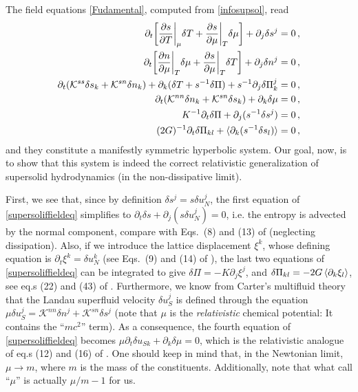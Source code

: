 \documentclass[a4paper, amsfonts, amssymb, amsmath, reprint, showkeys, nofootinbib, twoside, onecolumn,notitlepage]{revtex4-1}
\begin{document}
The field equations \eqref{Fudamental}, computed from \eqref{infosupsol}, read 
\begin{equation}\label{supersoliffieldeq}
\begin{split}
\partial_t \bigg[\dfrac{\partial s}{\partial T}\bigg|_{\mu}   \delta T + \dfrac{\partial s}{\partial \mu}\bigg|_{T}   \delta \mu  \bigg] +\partial_j \delta s^j ={}& 0 \, , \\
\partial_t \bigg[\dfrac{\partial n}{\partial \mu}\bigg|_{T}  \delta \mu + \dfrac{\partial s}{\partial \mu}\bigg|_{T}   \delta T  \bigg] +\partial_j \delta n^j={}& 0 \, , \\
\partial_t (\mathcal{K}^{ss} \delta s_k + \mathcal{K}^{sn}\delta n_k) +\partial_k (\delta T+s^{-1} \delta \Pi) + s^{-1} \partial_j \delta \Pi^j_k={}& 0 \, , \\
\partial_t (\mathcal{K}^{nn} \delta n_k + \mathcal{K}^{sn}\delta s_k) +\partial_k \delta \mu={}& 0 \, , \\
K^{-1} \partial_t \delta \Pi +\partial_j (s^{-1} \delta s^j)={}& 0 \, , \\
(2G)^{-1} \partial_t \delta \Pi_{kl} + \braket{\partial_k (s^{-1}\delta s_l)}={}& 0 \, , \\
\end{split}
\end{equation}
and they constitute a manifestly symmetric hyperbolic system. Our goal, now, is to show that this system is indeed the correct relativistic generalization of supersolid hydrodynamics \cite{Sears2010} (in the non-dissipative limit). 

First, we see that, since by definition $\delta s^j=s\delta u_N^j$, the first equation of \eqref{supersoliffieldeq} simplifies to $\partial_t \delta s+\partial_j (s\delta u_N^j)=0$, i.e. the entropy is advected by the normal component, compare with Eqs.\ (8) and (13) of \cite{Sears2010} (neglecting dissipation). Also, if we introduce the lattice displacement $\xi^k$, whose defining equation is $\partial_t \xi^k = \delta u_N^k$ (see Eqs.\ (9) and (14) of \cite{Sears2010}), the last two equations of \eqref{supersoliffieldeq} can be integrated to give $\delta \Pi=-K\partial_j \xi^j$, and $\delta \Pi_{kl}=-2G\braket{\partial_k \xi_l}$, see eq.s (22) and (43) of \cite{Sears2010}. Furthermore, we know from Carter's multifluid theory \cite{cool1995} that the Landau superfluid velocity $\delta u_S^j$ is defined through the equation $\mu  \delta u_S^j = \mathcal{K}^{nn}\delta n^j+\mathcal{K}^{sn}\delta s^j$ (note that $\mu$ is the \textit{relativistic} chemical potential: It contains the ``$mc^2$'' term). As a consequence, the fourth equation of \eqref{supersoliffieldeq} becomes $\mu \partial_t \delta u_{Sk}+\partial_k \delta \mu=0$, which is the relativistic analogue of eq.s (12) and (16) of \cite{Sears2010}. One should keep in mind that, in the Newtonian limit, $\mu \rightarrow m$, where $m$ is the mass of the constituents. Additionally, note that what \cite{Sears2010} call ``$\mu$'' is actually $\mu/m -1$ for us.   
\end{document}
